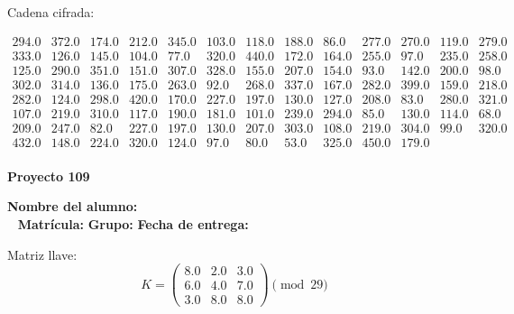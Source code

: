 \documentclass[12pt]{article}
\begin{document}
Cadena cifrada:
\begin{center}
$\begin{array}{lllllllllllll}
294.0 & 372.0 & 174.0 & 212.0 & 345.0 & 103.0 & 118.0 & 188.0 & 86.0 & 277.0 & 270.0 & 119.0 & 279.0\\
333.0 & 126.0 & 145.0 & 104.0 & 77.0 & 320.0 & 440.0 & 172.0 & 164.0 & 255.0 & 97.0 & 235.0 & 258.0\\
125.0 & 290.0 & 351.0 & 151.0 & 307.0 & 328.0 & 155.0 & 207.0 & 154.0 & 93.0 & 142.0 & 200.0 & 98.0\\
302.0 & 314.0 & 136.0 & 175.0 & 263.0 & 92.0 & 268.0 & 337.0 & 167.0 & 282.0 & 399.0 & 159.0 & 218.0\\
282.0 & 124.0 & 298.0 & 420.0 & 170.0 & 227.0 & 197.0 & 130.0 & 127.0 & 208.0 & 83.0 & 280.0 & 321.0\\
107.0 & 219.0 & 310.0 & 117.0 & 190.0 & 181.0 & 101.0 & 239.0 & 294.0 & 85.0 & 130.0 & 114.0 & 68.0\\
209.0 & 247.0 & 82.0 & 227.0 & 197.0 & 130.0 & 207.0 & 303.0 & 108.0 & 219.0 & 304.0 & 99.0 & 320.0\\
432.0 & 148.0 & 224.0 & 320.0 & 124.0 & 97.0 & 80.0 & 53.0 & 325.0 & 450.0 & 179.0\\
\end{array}$
\end{center}

\newpage


\textbf{Proyecto 109}

\textbf{Nombre del alumno:} \underline{\hspace{13cm}}\\\
\vspace{1cm}
\textbf{Matrícula:} \underline{\hspace{4cm}} \hspace{1cm}
\textbf{Grupo:} \underline{\hspace{2cm}}
\textbf{Fecha de entrega:} \underline{\hspace{2cm}}

\medskip

Matriz llave:
\[
K = \begin{pmatrix}
8.0 & 2.0 & 3.0\\
6.0 & 4.0 & 7.0\\
3.0 & 8.0 & 8.0
\end{pmatrix} \pmod{29}
\]
\end{document}
